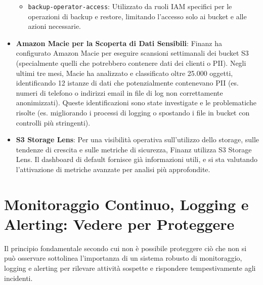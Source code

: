 \begin{itemize}
\begin{itemize}
            \item \texttt{backup-operator-access}: Utilizzato da ruoli IAM specifici per le operazioni di backup e restore, limitando l'accesso solo ai bucket e alle azioni necessarie.
        \end{itemize}
    \item \textbf{Amazon Macie per la Scoperta di Dati Sensibili}: Finanz ha configurato Amazon Macie per eseguire scansioni settimanali dei bucket S3 (specialmente quelli che potrebbero contenere dati dei clienti o PII). Negli ultimi tre mesi, Macie ha analizzato e classificato oltre 25.000 oggetti, identificando 12 istanze di dati che potenzialmente contenevano PII (es. numeri di telefono o indirizzi email in file di log non correttamente anonimizzati). Queste identificazioni sono state investigate e le problematiche risolte (es. migliorando i processi di logging o spostando i file in bucket con controlli più stringenti).
    \item \textbf{S3 Storage Lens}: Per una visibilità operativa sull'utilizzo dello storage, sulle tendenze di crescita e sulle metriche di sicurezza, Finanz utilizza S3 Storage Lens. Il dashboard di default fornisce già informazioni utili, e si sta valutando l'attivazione di metriche avanzate per analisi più approfondite.
\end{itemize}

\section{Monitoraggio Continuo, Logging e Alerting: Vedere per Proteggere}
\label{sec:monitoring-logging_cap2}
Il principio fondamentale secondo cui non è possibile proteggere ciò che non si può osservare sottolinea l'importanza di un sistema robusto di monitoraggio, logging e alerting per rilevare attività sospette e rispondere tempestivamente agli incidenti.

